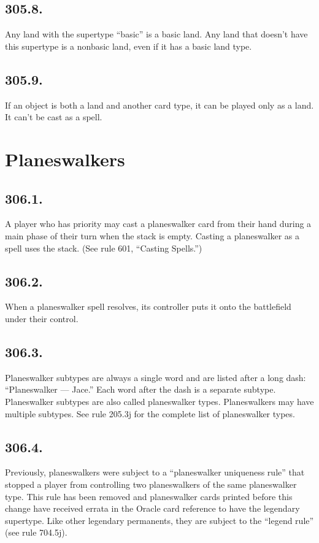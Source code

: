 \subsection*{305.8.}
Any land with the supertype “basic” is a basic land. Any land that doesn’t have this supertype is a nonbasic land, even if it has a basic land type.

\subsection*{305.9.}
If an object is both a land and another card type, it can be played only as a land. It can’t be cast as a spell.

\section{Planeswalkers}
\subsection*{306.1.}
A player who has priority may cast a planeswalker card from their hand during a main phase of their turn when the stack is empty. Casting a planeswalker as a spell uses the stack. (See rule 601, “Casting Spells.”)

\subsection*{306.2.}
When a planeswalker spell resolves, its controller puts it onto the battlefield under their control.

\subsection*{306.3.}
Planeswalker subtypes are always a single word and are listed after a long dash: “Planeswalker — Jace.” Each word after the dash is a separate subtype. Planeswalker subtypes are also called planeswalker types. Planeswalkers may have multiple subtypes. See rule 205.3j for the complete list of planeswalker types.

\subsection*{306.4.}
Previously, planeswalkers were subject to a “planeswalker uniqueness rule” that stopped a player from controlling two planeswalkers of the same planeswalker type. This rule has been removed and planeswalker cards printed before this change have received errata in the Oracle card reference to have the legendary supertype. Like other legendary permanents, they are subject to the “legend rule” (see rule 704.5j).


